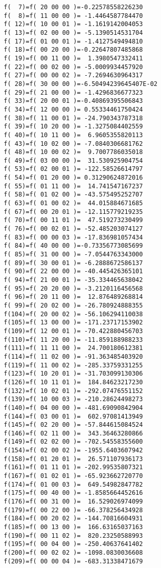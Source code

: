 \begin{footnotesize}
\begin{verbatim}
  f(  7)=f( 20 00 00 )=-0.22578558226230
  f(  8)=f( 11 00 00 )= -1.4464587784470
  f( 12)=f( 10 00 01 )= -1.1619142004053
  f( 13)=f( 02 00 00 )= -5.1390514531704
  f( 17)=f( 01 00 01 )= -1.4127549494810
  f( 18)=f( 00 20 00 )=-0.22647807485868
  f( 19)=f( 00 11 00 )=  1.3980547332411
  f( 22)=f( 00 02 00 )= -5.0009934457920
  f( 27)=f( 00 00 02 )= -7.2694630964317
  f( 28)=f( 30 00 00 )=-6.50494239645407E-02
  f( 29)=f( 21 00 00 )= -1.4296836677323
  f( 33)=f( 20 00 01 )=-0.40869395506843
  f( 34)=f( 12 00 00 )= 0.55334461750424
  f( 38)=f( 11 00 01 )= -24.790343787318
  f( 39)=f( 10 20 00 )= -1.3275084402559
  f( 40)=f( 10 11 00 )=  6.9605355820113
  f( 43)=f( 10 02 00 )= -7.0840306681762
  f( 48)=f( 10 00 02 )=  9.7007786035018
  f( 49)=f( 03 00 00 )=  31.530925904754
  f( 53)=f( 02 00 01 )= -122.58526614797
  f( 54)=f( 01 20 00 )= 0.31290624872016
  f( 55)=f( 01 11 00 )=  14.741547167237
  f( 58)=f( 01 02 00 )= -43.575495252707
  f( 63)=f( 01 00 02 )=  44.015884671685
  f( 67)=f( 00 20 01 )= -12.115779219235
  f( 70)=f( 00 11 01 )=  47.519273230499
  f( 76)=f( 00 02 01 )= -52.485203074127
  f( 83)=f( 00 00 03 )= -17.836981057434
  f( 84)=f( 40 00 00 )=-0.73356773085699
  f( 85)=f( 31 00 00 )= -7.0544763343000
  f( 89)=f( 30 00 01 )= -6.2888672586137
  f( 90)=f( 22 00 00 )= -40.445426365101
  f( 94)=f( 21 00 01 )= -35.334465638042
  f( 95)=f( 20 20 00 )= -3.2120116456568
  f( 96)=f( 20 11 00 )=  12.876489268814
  f( 99)=f( 20 02 00 )= -26.780924888355
  f(104)=f( 20 00 02 )= -56.106294110038
  f(105)=f( 13 00 00 )= -171.23717153902
  f(109)=f( 12 00 01 )= -70.422880456703
  f(110)=f( 11 20 00 )= -11.859188988233
  f(111)=f( 11 11 00 )=  24.700180612381
  f(114)=f( 11 02 00 )= -91.363485403920
  f(119)=f( 11 00 02 )= -285.33759331255
  f(123)=f( 10 20 01 )= -31.703099130306
  f(126)=f( 10 11 01 )=  184.84623217230
  f(132)=f( 10 02 01 )= -292.07476551152
  f(139)=f( 10 00 03 )= -210.28624498273
  f(140)=f( 04 00 00 )= -481.69090842904
  f(144)=f( 03 00 01 )=  602.97081413949
  f(145)=f( 02 20 00 )= -57.844615084524
  f(146)=f( 02 11 00 )=  343.36463280866
  f(149)=f( 02 02 00 )= -702.54558355600
  f(154)=f( 02 00 02 )= -1955.6403607942
  f(158)=f( 01 20 01 )=  26.571107936173
  f(161)=f( 01 11 01 )= -202.99535807321
  f(167)=f( 01 02 01 )= -65.923662720770
  f(174)=f( 01 00 03 )=  649.54982847782
  f(175)=f( 00 40 00 )= -1.8585664452616
  f(176)=f( 00 31 00 )=  16.529026974099
  f(179)=f( 00 22 00 )= -66.378256434928
  f(184)=f( 00 20 02 )= -144.70816604931
  f(185)=f( 00 13 00 )=  166.63165037163
  f(190)=f( 00 11 02 )=  820.23250588993
  f(195)=f( 00 04 00 )= -250.40637641402
  f(200)=f( 00 02 02 )= -1098.0830036608
  f(209)=f( 00 00 04 )= -683.31338471679


\end{verbatim}
\end{footnotesize}

